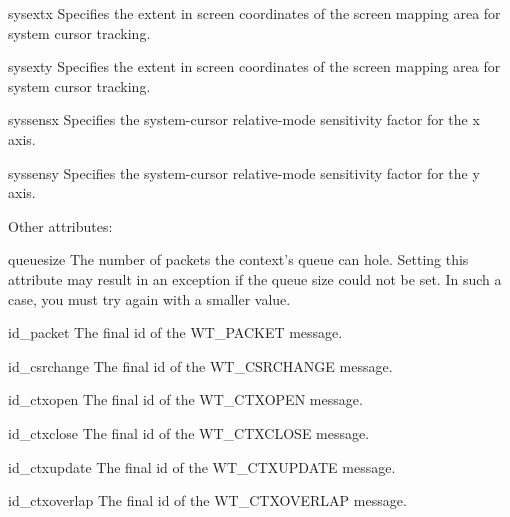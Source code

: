\begin{memberdesc}{sysextx}
Specifies the extent in screen coordinates of the screen mapping area
for system cursor tracking.
\end{memberdesc}

\begin{memberdesc}{sysexty}
Specifies the extent in screen coordinates of the screen mapping area
for system cursor tracking.
\end{memberdesc}

\begin{memberdesc}{syssensx}
Specifies the system-cursor relative-mode sensitivity factor for the
x axis.
\end{memberdesc}

\begin{memberdesc}{syssensy}
Specifies the system-cursor relative-mode sensitivity factor for the
y axis.
\end{memberdesc}

Other attributes:

\begin{memberdesc}{queuesize}
The number of packets the context's queue can hole. Setting this attribute
may result in an exception if the queue size could not be set. In such a
case, you must try again with a smaller value.
\end{memberdesc}

\begin{memberdesc}{id_packet}
The final id of the WT_PACKET message.
\end{memberdesc}

\begin{memberdesc}{id_csrchange}
The final id of the WT_CSRCHANGE message.
\end{memberdesc}

\begin{memberdesc}{id_ctxopen}
The final id of the WT_CTXOPEN message.
\end{memberdesc}

\begin{memberdesc}{id_ctxclose}
The final id of the WT_CTXCLOSE message.
\end{memberdesc}

\begin{memberdesc}{id_ctxupdate}
The final id of the WT_CTXUPDATE message.
\end{memberdesc}

\begin{memberdesc}{id_ctxoverlap}
The final id of the WT_CTXOVERLAP message.
\end{memberdesc}

